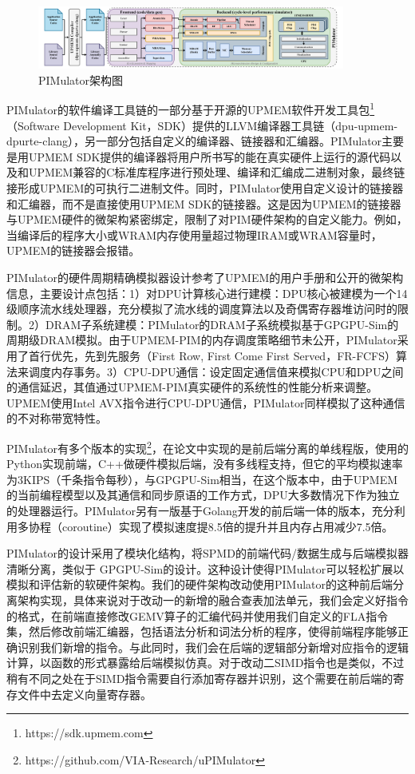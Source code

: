 \begin{figure}[!htbp]
	\centering
    \includegraphics[width=0.9\textwidth]{figures/PIMulator.pdf}
	\caption{PIMulator架构图}
    \label{PIMulator}
\end{figure}

PIMulator的软件编译工具链的一部分基于开源的UPMEM软件开发工具包\footnote{https://sdk.upmem.com}（Software Development Kit，SDK）提供的LLVM\cite{LLVM}编译器工具链（dpu-upmem-dpurte-clang），另一部分包括自定义的编译器、链接器和汇编器。PIMulator主要是用UPMEM SDK提供的编译器将用户所书写的能在真实硬件上运行的源代码以及和UPMEM兼容的C标准库程序进行预处理、编译和汇编成二进制对象，最终链接形成UPMEM的可执行二进制文件。同时，PIMulator使用自定义设计的链接器和汇编器，而不是直接使用UPMEM SDK的链接器。这是因为UPMEM的链接器与UPMEM硬件的微架构紧密绑定，限制了对PIM硬件架构的自定义能力。例如，当编译后的程序大小或WRAM内存使用量超过物理IRAM或WRAM容量时，UPMEM的链接器会报错。

PIMulator的硬件周期精确模拟器设计参考了UPMEM的用户手册和公开的微架构信息，主要设计点包括：1）对DPU计算核心进行建模：DPU核心被建模为一个14级顺序流水线处理器，充分模拟了流水线的调度算法以及奇偶寄存器堆访问时的限制。2）DRAM子系统建模：PIMulator的DRAM子系统模拟基于GPGPU-Sim的周期级DRAM模拟\cite{GPGPU-Sim}。由于UPMEM-PIM的内存调度策略细节未公开，PIMulator采用了首行优先，先到先服务（First Row, First Come First Served，FR-FCFS）算法来调度内存事务。3）CPU-DPU通信：设定固定通信值来模拟CPU和DPU之间的通信延迟，其值通过UPMEM-PIM真实硬件的系统性的性能分析来调整。UPMEM使用Intel AVX指令进行CPU-DPU通信，PIMulator同样模拟了这种通信的不对称带宽特性。

PIMulator有多个版本的实现\footnote{https://github.com/VIA-Research/uPIMulator}，在论文中实现的是前后端分离的单线程版，使用的Python实现前端，C++做硬件模拟后端，没有多线程支持，但它的平均模拟速率为3KIPS（千条指令每秒），与GPGPU-Sim相当，在这个版本中，由于UPMEM的当前编程模型以及其通信和同步原语的工作方式，DPU大多数情况下作为独立的处理器运行。PIMulator另有一版基于Golang开发的前后端一体的版本，充分利用多协程（coroutine）实现了模拟速度提8.5倍的提升并且内存占用减少7.5倍。

PIMulator的设计采用了模块化结构，将SPMD的前端代码/数据生成与后端模拟器清晰分离，类似于 GPGPU-Sim的设计。这种设计使得PIMulator可以轻松扩展以模拟和评估新的软硬件架构。我们的硬件架构改动使用PIMulator的这种前后端分离架构实现，具体来说对于改动一的新增的融合查表加法单元，我们会定义好指令的格式，在前端直接修改GEMV算子的汇编代码并使用我们自定义的FLA指令集，然后修改前端汇编器，包括语法分析和词法分析的程序，使得前端程序能够正确识别我们新增的指令。与此同时，我们会在后端的逻辑部分新增对应指令的逻辑计算，以函数的形式暴露给后端模拟仿真。对于改动二SIMD指令也是类似，不过稍有不同之处在于SIMD指令需要自行添加寄存器并识别，这个需要在前后端的寄存文件中去定义向量寄存器。

